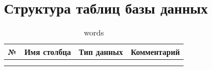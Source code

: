\documentclass[main]{subfiles}
\begin{document}
\section{Структура таблиц базы данных}\label{app:A}

\begin{table}[!h]
	\begin{center}
		\captionsetup{format=hang,labelsep = endash, singlelinecheck=false}
		\caption{words}
		\begin{tabular}{|c|l|l|l|}
			\hline
			\textbf{№} & \multicolumn{1}{c|}{\textbf{Имя столбца}} & \multicolumn{1}{c|}{\textbf{Тип данных}} & \multicolumn{1}{c|}{\textbf{Комментарий}} \\ \hline
			&                                  &                                 &                                  \\ \hline
			&                                  &                                 &                                  \\ \hline
		\end{tabular}
	\end{center}
\end{table}
\end{document}
